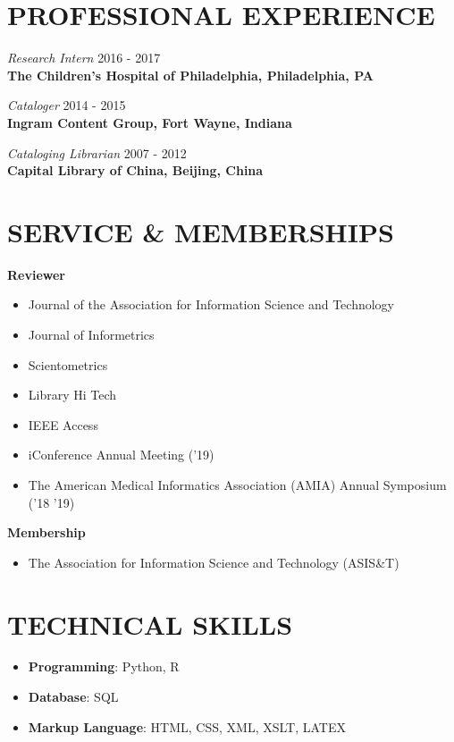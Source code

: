 \documentclass[margin, 10pt]{res} %
\begin{document}
\begin{resume}
\section{PROFESSIONAL EXPERIENCE}

\textit{Research Intern} \hfill 2016 - 2017\\
\textbf{The Children’s Hospital of Philadelphia, Philadelphia, PA}

\textit{Cataloger} \hfill 2014 - 2015\\
\textbf{Ingram Content Group, Fort Wayne, Indiana}

\textit{Cataloging Librarian} \hfill 2007 - 2012\\
\textbf{Capital Library of China, Beijing, China}

\section{SERVICE \& MEMBERSHIPS}

\textbf{Reviewer}
\begin{itemize}
\item Journal of the Association for Information Science and Technology
\item Journal of Informetrics
\item Scientometrics
\item Library Hi Tech
\item IEEE Access
\item iConference Annual Meeting ('19)
\item The American Medical Informatics Association (AMIA) Annual Symposium ('18 '19)
\end{itemize}

\textbf{Membership}
\begin{itemize}
\item The Association for Information Science and Technology (ASIS\&T)
\end{itemize}

\section{TECHNICAL SKILLS}
\begin{itemize}
\item \textbf{Programming}: Python, R
\item \textbf{Database}: SQL
\item \textbf{Markup Language}: HTML, CSS, XML, XSLT, LATEX
\end{itemize}



\end{resume}
\end{document}
